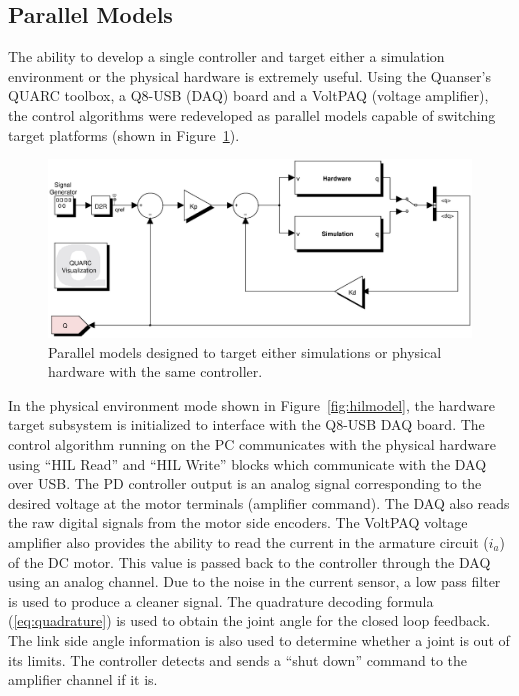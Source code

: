 \subsection{Parallel Models} %
\label{sub:parallel_models}

The ability to develop a single controller and target either a simulation environment or the physical hardware is extremely useful. Using the Quanser's QUARC toolbox, a Q8-USB (DAQ) board and a VoltPAQ (voltage amplifier), the control algorithms were redeveloped as parallel models capable of switching target platforms (shown in Figure~\ref{fig:parallelmodels}).

\begin{figure}[!h]
	\centering
    \includegraphics[scale=0.6]{fig/experiments/parallelmodels.eps} 
  	\caption{Parallel models designed to target either simulations or physical hardware with the same controller.}
	\label{fig:parallelmodels}
\end{figure}

In the physical environment mode shown in Figure~\ref{fig:hilmodel}, the hardware target subsystem is initialized to interface with the Q8-USB DAQ board. The control algorithm running on the PC communicates with the physical hardware using ``HIL Read'' and ``HIL Write'' blocks which communicate with the DAQ over USB. The PD controller output is an analog signal corresponding to the desired voltage at the motor terminals (amplifier command). The DAQ also reads the raw digital signals from the motor side encoders. The VoltPAQ voltage amplifier also provides the ability to read the current in the armature circuit ($i_a$) of the DC motor. This value is passed back to the controller through the DAQ using an analog channel. Due to the noise in the current sensor, a low pass filter is used to produce a cleaner signal. The quadrature decoding formula (\ref{eq:quadrature}) is used to obtain the joint angle for the closed loop feedback. The link side angle information is also used to determine whether a joint is out of its limits. The controller detects and sends a ``shut down'' command to the amplifier channel if it is. 


